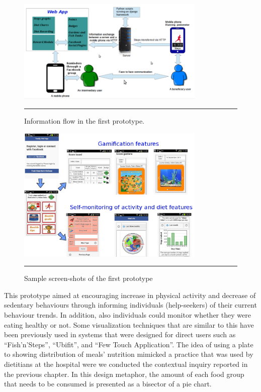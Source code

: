 \begin{figure}[htbp]
  \centering
    \includegraphics[width=0.8\textwidth]{Figures/prototype_1.png}
    \rule{35em}{0.5pt}
  \caption{Information flow in the first prototype.}
  \label{figure:prototype_1}
\end{figure}

\begin{figure}[htbp]
  \centering
    \includegraphics[width=0.8\textwidth]{Figures/Version1/Prototype1Screenshots.png}
    \rule{35em}{0.5pt}
  \caption{Sample screen-shots of the first prototype}
  \label{figure:prototype_1_screens}
\end{figure}

This prototype aimed at encouraging increase in physical activity and  decrease of sedentary behaviours through informing individuals (help-seekers) of their current behaviour trends. In addition, also individuals could monitor whether they were eating healthy or not. Some visualization techniques that are similar to this have been previously used  in systems that were designed for direct users such as ``Fish'n'Steps''\citep{lin2006:fish}, ``Ubifit''\citep{klasnja2009:using},  and ``Few Touch Application''\citep{arsand:mobile}. The idea of using a plate to showing distribution of meals' nutrition mimicked a practice that was used by dietitians at the hospital were we conducted the contextual inquiry reported in the previous chapter. In this design metaphor, the amount of each food group that needs to be consumed is presented as a bisector of a pie chart. 
